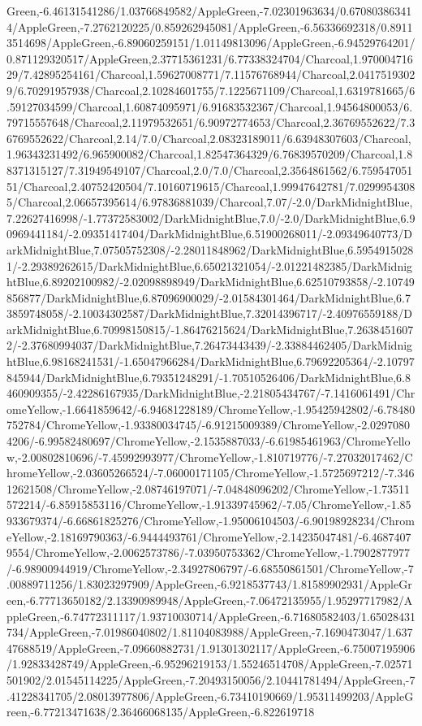 {\begin{tikzternal}
Green,-6.46131541286/1.03766849582/AppleGreen,-7.02301963634/0.670803863414/AppleGreen,-7.2762120225/0.859262945081/AppleGreen,-6.56336692318/0.89113514698/AppleGreen,-6.89060259151/1.01149813096/AppleGreen,-6.94529764201/0.871129320517/AppleGreen,2.37715361231/6.77338324704/Charcoal,1.97000471629/7.42895254161/Charcoal,1.59627008771/7.11576768944/Charcoal,2.04175193029/6.70291957938/Charcoal,2.10284601755/7.1225671109/Charcoal,1.6319781665/6.59127034599/Charcoal,1.60874095971/6.91683532367/Charcoal,1.94564800053/6.79715557648/Charcoal,2.11979532651/6.90972774653/Charcoal,2.36769552622/7.36769552622/Charcoal,2.14/7.0/Charcoal,2.08323189011/6.63948307603/Charcoal,1.96343231492/6.965900082/Charcoal,1.82547364329/6.76839570209/Charcoal,1.88371315127/7.31949549107/Charcoal,2.0/7.0/Charcoal,2.3564861562/6.75954705151/Charcoal,2.40752420504/7.10160719615/Charcoal,1.99947642781/7.02999543085/Charcoal,2.06657395614/6.97836881039/Charcoal,7.07/-2.0/DarkMidnightBlue,7.22627416998/-1.77372583002/DarkMidnightBlue,7.0/-2.0/DarkMidnightBlue,6.90969441184/-2.09351417404/DarkMidnightBlue,6.51900268011/-2.09349640773/DarkMidnightBlue,7.07505752308/-2.28011848962/DarkMidnightBlue,6.59549150281/-2.29389262615/DarkMidnightBlue,6.65021321054/-2.01221482385/DarkMidnightBlue,6.89202100982/-2.02098898949/DarkMidnightBlue,6.62510793858/-2.10749856877/DarkMidnightBlue,6.87096900029/-2.01584301464/DarkMidnightBlue,6.73859748058/-2.10034302587/DarkMidnightBlue,7.32014396717/-2.40976559188/DarkMidnightBlue,6.70998150815/-1.86476215624/DarkMidnightBlue,7.26384516072/-2.37680994037/DarkMidnightBlue,7.26473443439/-2.33884462405/DarkMidnightBlue,6.98168241531/-1.65047966284/DarkMidnightBlue,6.79692205364/-2.10797845944/DarkMidnightBlue,6.79351248291/-1.70510526406/DarkMidnightBlue,6.8460909355/-2.42286167935/DarkMidnightBlue,-2.21805434767/-7.1416061491/ChromeYellow,-1.6641859642/-6.94681228189/ChromeYellow,-1.95425942802/-6.78480752784/ChromeYellow,-1.93380034745/-6.91215009389/ChromeYellow,-2.02970804206/-6.99582480697/ChromeYellow,-2.1535887033/-6.61985461963/ChromeYellow,-2.00802810696/-7.45992993977/ChromeYellow,-1.810719776/-7.27032017462/ChromeYellow,-2.03605266524/-7.06000171105/ChromeYellow,-1.5725697212/-7.34612621508/ChromeYellow,-2.08746197071/-7.04848096202/ChromeYellow,-1.73511572214/-6.85915853116/ChromeYellow,-1.91339745962/-7.05/ChromeYellow,-1.85933679374/-6.66861825276/ChromeYellow,-1.95006104503/-6.90198928234/ChromeYellow,-2.18169790363/-6.9444493761/ChromeYellow,-2.14235047481/-6.46874079554/ChromeYellow,-2.0062573786/-7.03950753362/ChromeYellow,-1.7902877977/-6.98900944919/ChromeYellow,-2.34927806797/-6.68550861501/ChromeYellow,-7.00889711256/1.83023297909/AppleGreen,-6.9218537743/1.81589902931/AppleGreen,-6.77713650182/2.13390989948/AppleGreen,-7.06472135955/1.95297717982/AppleGreen,-6.74772311117/1.93710030714/AppleGreen,-6.71680582403/1.65028431734/AppleGreen,-7.01986040802/1.81104083988/AppleGreen,-7.1690473047/1.63747688519/AppleGreen,-7.09660882731/1.91301302117/AppleGreen,-6.75007195906/1.92833428749/AppleGreen,-6.95296219153/1.55246514708/AppleGreen,-7.02571501902/2.01545114225/AppleGreen,-7.20493150056/2.10441781494/AppleGreen,-7.41228341705/2.08013977806/AppleGreen,-6.73410190669/1.95311499203/AppleGreen,-6.77213471638/2.36466068135/AppleGreen,-6.822619718
\end{tikzternal}}

